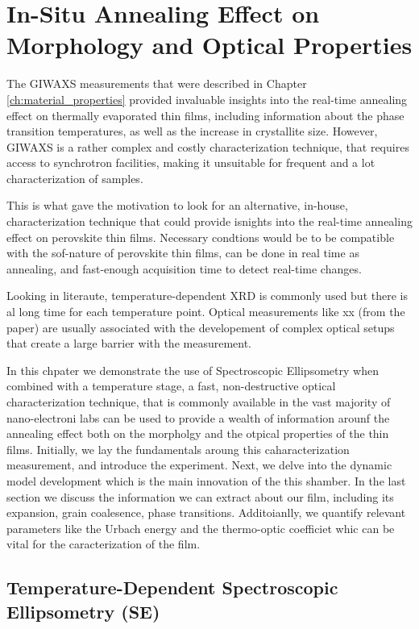 \chapter{In-Situ Annealing Effect on Morphology and Optical Properties}\label{ch:ellipsometry}


The GIWAXS measurements that were described in Chapter \ref{ch:material_properties} provided invaluable insights into the real-time annealing effect on thermally evaporated  thin films, including information about the phase transition temperatures, as well as the increase in crystallite size. However, GIWAXS is a rather complex and costly characterization technique, that requires access to synchrotron facilities, making it unsuitable for frequent and a lot characterization of samples. 

This is what gave the motivation to look for an alternative, in-house, characterization technique that could provide isnights into the real-time annealing effect on perovskite thin films. Necessary condtions would be to be compatible with the sof-nature of perovskite thin films, can be done in real time as annealing, and fast-enough acquisition time to detect real-time changes. 

Looking in literaute, temperature-dependent XRD is commonly used but there is al long time for each temperature point. Optical measurements like xx (from the paper) are usually associated with the developement of complex optical setups that create a large barrier with the measurement. 

In this chpater we demonstrate the use of Spectroscopic Ellipsometry when combined with a temperature stage, a fast, non-destructive optical characterization technique, that is commonly available in the vast majority of nano-electroni labs can be used to provide a wealth of information arounf the annealing effect both on the morpholgy and the otpical properties of the thin films. 
Initially, we lay the fundamentals aroung this caharacterization measurement, and introduce the experiment. Next, we delve into the dynamic model development which is the main innovation of the this shamber. In the last section we discuss the information we can extract about our film, including its expansion, grain coalesence, phase transitions. Additoianlly, we quantify relevant parameters like the Urbach energy and the thermo-optic coefficiet whic can be vital for the caracterization of the film. 




\section{Temperature-Dependent Spectroscopic Ellipsometry (SE)}


